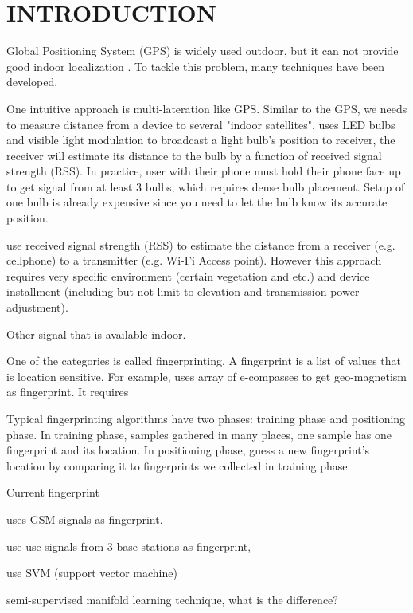 \chapter{INTRODUCTION}

Global Positioning System (GPS) is widely used outdoor, but it can not provide good indoor localization \cite{pulkkinen2011semi, varshavsky2007gsm}. To tackle this problem, many techniques have been developed. 

One intuitive approach is multi-lateration like GPS. Similar to the GPS, we needs to measure distance from a device to several "indoor satellites". \cite{hu2013pharos} uses LED bulbs and visible light modulation to broadcast a light bulb's position to receiver, the receiver will estimate its distance to the bulb by a function of received signal strength (RSS). In practice, user with their phone must hold their phone face up to get signal from at least 3 bulbs, which requires dense bulb placement. Setup of one bulb is already expensive since you need to let the bulb know its accurate position. 

\cite{whitehouse2007practical} use received signal strength (RSS) to estimate the distance from a receiver (e.g. cellphone) to a transmitter (e.g. Wi-Fi Access point). However this approach requires very specific environment (certain vegetation and etc.) and device installment (including but not limit to elevation and transmission power adjustment). 

Other signal that is available indoor. 
 
One of the categories is called fingerprinting. A fingerprint is a list of values that is location sensitive. For example, \cite{chung2011indoor} uses array of e-compasses to get geo-magnetism as fingerprint. It requires  

Typical fingerprinting algorithms have two phases: training phase and positioning phase. In training phase, samples gathered in many places, one sample has one fingerprint and its location. In positioning phase, guess a new fingerprint's location by comparing it to fingerprints we collected in training phase. 

Current fingerprint 


\cite{varshavsky2007gsm} uses GSM signals as fingerprint. 

\cite{bahl2000radar} use use signals from 3 base stations as fingerprint,

\cite{brunato2005statistical} use SVM (support vector machine)

\cite{pulkkinen2011semi}semi-supervised manifold learning technique, what is the difference? 

